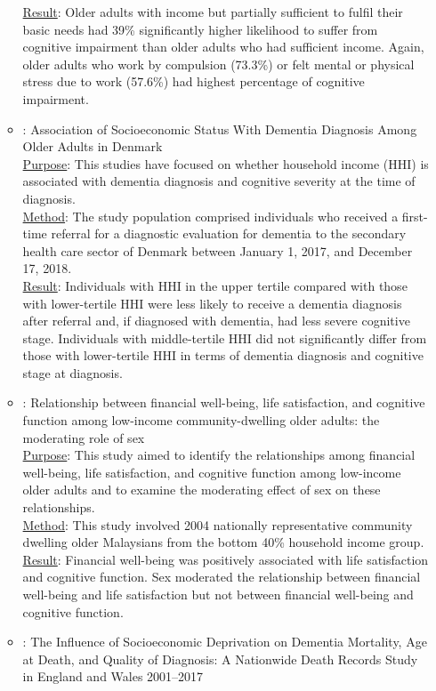 \documentclass[12pt]{article}
\begin{document}
\begin{itemize}
\begin{itemize}
        \uline{Result}: 
        Older adults with income but partially sufficient to fulfil their basic needs had 39\% significantly higher likelihood to suffer from cognitive impairment than older adults who had sufficient income. Again, older adults who work by compulsion (73.3\%) or felt mental or physical stress due to work (57.6\%) had highest percentage of cognitive impairment. 
        \item \cite{petersen2021association}: Association of Socioeconomic Status With Dementia Diagnosis Among Older Adults in Denmark \\
        \uline{Purpose}: 
        This studies have focused on whether household income (HHI) is associated with dementia diagnosis and cognitive severity at the time of diagnosis. \\
        \uline{Method}: 
        The study population comprised individuals who received a first-time referral for a diagnostic evaluation for dementia to the secondary health care sector of Denmark between January 1, 2017, and December 17, 2018. \\
        \uline{Result}: 
        Individuals with HHI in the upper tertile compared with those with lower-tertile HHI were less likely to receive a dementia diagnosis after referral and, if diagnosed with dementia, had less severe cognitive stage. Individuals with middle-tertile HHI did not significantly differ from those with lower-tertile HHI in terms of dementia diagnosis and cognitive stage at diagnosis.
        \item \cite{foong2021relationship}: Relationship between financial well-being, life satisfaction, and cognitive function among low-income community-dwelling older adults: the moderating role of sex \\
        \uline{Purpose}: 
        This study aimed to identify the relationships among financial well-being, life satisfaction, and cognitive function among low-income older adults and to examine the moderating effect of sex on these relationships.\\
        \uline{Method}: 
        This study involved 2004 nationally representative community dwelling older Malaysians from the bottom 40\% household income group. \\
        \uline{Result}: 
        Financial well-being was positively associated with life satisfaction and cognitive function. Sex moderated the relationship between financial well-being and life satisfaction but not between financial well-being and cognitive function.
        \item \cite{jitlal2021influence}: The Influence of Socioeconomic Deprivation on Dementia Mortality, Age at Death, and Quality of Diagnosis: A Nationwide Death Records Study in England and Wales 2001–2017 \\

\end{itemize}
\end{itemize}
\end{document}

